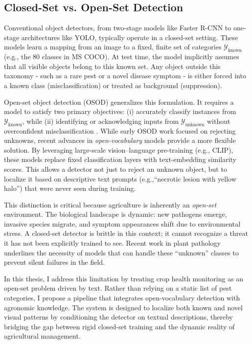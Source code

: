
\subsection{Closed-Set vs. Open-Set Detection}

Conventional object detectors, from two-stage models like Faster R-CNN\cite{fasterrcnn_ren2015} to one-stage architectures like YOLO, typically operate in a closed-set setting. These models learn a mapping from an image to a fixed, finite set of categories $\mathcal{Y}_{\text{known}}$ (e.g., the 80 classes in MS COCO)\cite{lin2014coco}. At test time, the model implicitly assumes that all visible objects belong to this known set. Any object outside this taxonomy - such as a rare pest or a novel disease symptom - is either forced into a known class (misclassification) or treated as background (suppression).

Open-set object detection (OSOD) generalizes this formulation. It requires a model to satisfy two primary objectives: (i) accurately classify instances from $\mathcal{Y}_{\text{known}}$, while (ii) identifying or acknowledging inputs from $\mathcal{Y}_{\text{unknown}}$ without overconfident misclassification \cite{dhamija2020openset}. While early OSOD work focused on rejecting unknowns, recent advances in \emph{open-vocabulary} models provide a more flexible solution. By leveraging large-scale vision--language pre-training (e.g., CLIP), these models replace fixed classification layers with text-embedding similarity scores.\cite{radford2021clip,zhu2024surveyovd} This allows a detector not just to reject an unknown object, but to localize it based on descriptive text prompts (e.g.,``necrotic lesion with yellow halo'') that were never seen during training.



This distinction is critical because agriculture is inherently an \emph{open-set} environment. The biological landscape is dynamic: new pathogens emerge, invasive species migrate, and symptom appearances shift due to environmental stress.\cite{fuentes2021opensettomato} A closed-set detector is brittle in this context; it cannot recognize a threat it has not been explicitly trained to see. Recent work in plant pathology underlines the necessity of models that can handle these ``unknown'' classes to prevent silent failures in the field.\cite{shen2024opensetpest}

In this thesis, I address this limitation by treating crop health monitoring as an open-set problem driven by text. Rather than relying on a static list of pest categories, I propose a pipeline that integrates open-vocabulary detection with agronomic knowledge. The system is designed to localize both known and novel visual patterns by conditioning the detector on textual descriptions, thereby bridging the gap between rigid closed-set training and the dynamic reality of agricultural management.

